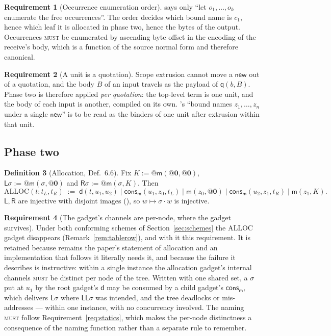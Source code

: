 \documentclass[11pt,a4paper]{article}
\makeatletter
\newcommand{\MUST}{\textsc{must}}
\newcommand{\quo}[1]{@#1}
\newcommand{\nil}{\mathbf{0}}
\newcommand{\mm}{\mathsf{m}}
\newcommand{\dd}{\mathsf{d}}
\newcommand{\qq}{\mathsf{q}}
\newcommand{\cons}{\mathsf{cons}}
\newcommand{\Lft}{\mathsf{L}}
\newcommand{\Rgt}{\mathsf{R}}
\newcommand{\ALLOC}{\mathrm{ALLOC}}
\theoremstyle{definition}
\newtheorem{definition}{Definition}[section]
\newtheorem{requirement}[definition]{Requirement}
\theoremstyle{plain}
\makeatother
\begin{document}
\begin{requirement}[Occurrence enumeration order]\label{req:occorder}
\cite[Def.~6.3]{draft3} says only ``let $o_{1},\dots,o_{k}$ enumerate the free
occurrences''. The order decides which bound name is $c_{1}$, hence which leaf
it is allocated in phase two, hence the bytes of the output. Occurrences
\MUST{} be enumerated by ascending byte offset in the encoding of the
receive's body, which is a function of the source normal form and therefore
canonical.
\end{requirement}

\begin{requirement}[A unit is a quotation]\label{req:units}
Scope extrusion cannot move a $\mathsf{new}$ out of a quotation, and the body
$B$ of an input travels as the payload of $\qq(b,B)$. Phase two is therefore
applied \emph{per quotation}: the top-level term is one unit, and the body of
each input is another, compiled on its own. \cite[Def.~6.8]{draft3}'s ``bound
names $z_{1},\dots,z_{n}$ under a single $\mathsf{new}$'' is to be read as the
binders of one unit after extrusion within that unit.
\end{requirement}

\subsection{Phase two}\label{sec:phase2}

\begin{definition}[Allocation, \cite{draft3} Def.~6.6]\label{def:alloc}
Fix $K := \quo{\mm(\quo{\nil},\quo{\nil})}$,
$\Lft\sigma := \quo{\mm(\sigma,\quo{\nil})}$ and
$\Rgt\sigma := \quo{\mm(\sigma,K)}$. Then
\[
  \ALLOC(t;t_{L},t_{R}) \;:=\;
  \dd(t,u_{1},u_{2}) \mid \cons_{\mm}(u_{1},z_{0},t_{L}) \mid
  \mm(z_{0},\quo{\nil}) \mid \cons_{\mm}(u_{2},z_{1},t_{R}) \mid \mm(z_{1},K).
\]
$\Lft,\Rgt$ are injective with disjoint images
(\cite[Lem.~6.7]{draft3}), so $w \mapsto \sigma\!\cdot\!w$ is injective.
\end{definition}

\begin{requirement}[The gadget's channels are per-node, where the gadget
survives]\label{req:pergadget}
Under both conforming schemes of Section~\ref{sec:schemes} the $\ALLOC$ gadget
disappears (Remark~\ref{rem:tablerow}), and with it this requirement. It is
retained because \cite[Def.~6.6]{draft3} remains the paper's statement of
allocation and an implementation that follows it literally needs it, and
because the failure it describes is instructive: within a single instance the
allocation gadget's internal channels \MUST{} be distinct per node of the
tree. Written with one shared set, a $\sigma$ put at $u_{1}$ by the root
gadget's $\dd$ may be consumed by a child gadget's $\cons_{\mm}$, which
delivers $\Lft\sigma$ where $\Lft\Lft\sigma$ was intended, and the tree
deadlocks or mis-addresses --- within one instance, with no concurrency
involved. The naming \MUST{} follow Requirement~\ref{req:statics}, which makes
the per-node distinctness a consequence of the naming function rather than a
separate rule to remember.
\end{requirement}
\end{document}

